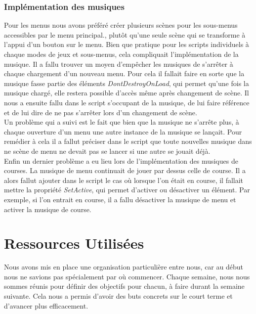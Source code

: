 \documentclass[12pt,a4paper]{article}
\begin{document}
            \subsubsection{Implémentation des musiques}
                Pour les menus nous avons préféré créer plusieurs scènes pour les sous-menus accessibles
                par le menu principal., plutôt qu'une seule scène qui se transforme à l'appui d'un 
                bouton sur le menu.
                Bien que pratique pour les scripts individuels à chaque modes de jeux et sous-menus,
                cela compliquait l'implémentation de la musique. Il a fallu trouver un moyen d'empêcher
                les musiques de s'arrêter à chaque chargement d'un nouveau menu. Pour cela il
                fallait faire en sorte que la musique fasse partie des éléments
                \textit{DontDestroyOnLoad}, qui permet qu'une fois la musique chargé, elle restera 
                possible d'accès
                même après changement de scène. Il nous a ensuite fallu dans le script s'occupant de la 
                musique, de lui faire référence et de lui dire de ne pas s'arrêter lors d'un changement
                de scène.\\
                Un problème qui a suivi est le fait que bien que la musique ne s'arrête plus, à chaque
                ouverture d'un menu une autre instance de la musique se lançait. Pour remédier à cela il
                a fallut préciser dans le script que toute nouvelles musique dans ne scène de menu ne
                devait pas se lancer si une autre se jouait déjà.\\
                Enfin un dernier problème a eu lieu lors de l'implémentation des musiques de courses. La
                musique de menu continuait de jouer par dessus celle de course. Il a alors fallut
                ajouter dans le script le cas où lorsque l'on était en course, il fallait mettre la 
                propriété \textit{SetActive}, qui permet d'activer ou désactiver un élément. Par 
                exemple, si l'on entrait en course, il a fallu désactiver la musique de menu et activer 
                la musique de course.

    \clearpage
    \section{Ressources Utilisées}
        Nous avons mis en place une organisation particulière entre nous,
        car au début nous ne savions pas spécialement par où commencer.
        Chaque semaine, nous nous sommes réunis pour définir des 
        objectifs pour chacun, à faire durant la semaine suivante. Cela nous 
        a permis d'avoir des buts concrets sur le court terme et d'avancer plus 
        efficacement.
\end{document}
